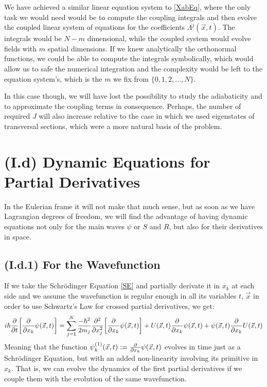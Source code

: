 \documentclass[11pt, a4paper]{article} %
\begin{document}
We have achieved a similar linear equation system to \eqref{XabEq}, where the only task we would need would be to compute the coupling integrals and then evolve the coupled linear system of equations for the coefficients $\Lambda^j(\vec{x},t)$. The integrals would be $N-m$ dimensional, while the coupled system would evolve fields with $m$ spatial dimensions. If we knew analytically the orthonormal functions, we could be able to compute the integrals symbolically, which would allow us to safe the numerical integration and the complexity would be left to the equation system's, which is the $m$ we fix from $\{0,1,2,...,N\}$.

In this case though, we will have lost the possibility to study the adiabaticity and to approximate the coupling terms in consequence. Perhaps, the number of required $J$ will also increase relative to the case in which we used eigenstates of transversal sections, which were a more natural basis of the problem.
\vspace{-0.3cm}


\section*{(I.d) Dynamic Equations for Partial Derivatives\vspace{-0.2cm}}
In the Eulerian frame it will not make that much sense, but as soon as we have Lagrangian degrees of freedom, we will find the advantage of having dynamic equations not only for the main waves $\psi$ or $S$ and $R$, but also for their derivatives in space.\vspace{-0.45cm}

\subsection*{(I.d.1) For the Wavefunction}
\vspace{-0.2cm}
If we take the Schrödinger Equation \eqref{SE} and partially derivate it in $x_k$ at each side and we assume the wavefunction is regular enough in all its variables $t$, $\vec{x}$ in order to use Schwartz's Law for crossed partial derivatives, we get:
\begin{equation}
i\hbar \pdv{}{t}\qty[\pdv{}{x_k}\psi(\vec{x},t)] = \sum_{j=1}^N\frac{-\hbar^2}{2m_j}\pdv[2]{}{x_j}\qty[\pdv{}{x_k}\psi(\vec{x},t)]+U(\vec{x},t)\pdv{}{x_k}\psi(\vec{x},t) + \psi(\vec{x},t)\pdv{}{x_k}U(\vec{x},t)
\end{equation}
Meaning that the function $\psi^{(1)}_k(\vec{x},t):=\pdv{}{x_k}\psi(\vec{x},t)$ evolves in time just as a Schrödinger Equation, but with an added non-linearity involving its primitive in $x_k$. That is, we can evolve the dynamics of the first partial derivatives if we couple them with the evolution of the same wavefunction.
\end{document}
